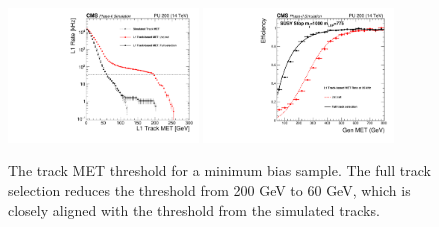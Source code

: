 \begin{figure}[htbp!]
\includegraphics[width=0.45\textwidth ]{MinBiasTKMETRatePlot.pdf}
\includegraphics[width=0.45\textwidth ]{turnonMET.pdf}
\caption{The track MET threshold for a minimum bias sample. The full track selection reduces the threshold from 200 GeV to 60 GeV, which is closely aligned with the threshold from the simulated tracks.}
\label{fig:TkMETPerformance}
\end{figure}




